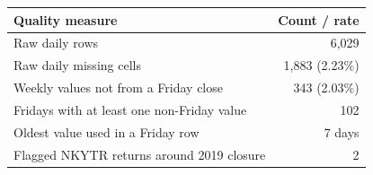 \par\medskip\noindent
{\small
\begin{tabular}{@{}lr@{}}
\toprule
Quality measure & Count / rate\\
\midrule
Raw daily rows & 6,029\\
Raw daily missing cells & 1,883 (2.23\%)\\
Weekly values not from a Friday close & 343 (2.03\%)\\
Fridays with at least one non-Friday value & 102\\
Oldest value used in a Friday row & 7 days\\
Flagged NKYTR returns around 2019 closure & 2\\
\bottomrule
\end{tabular}
}
\par\medskip
